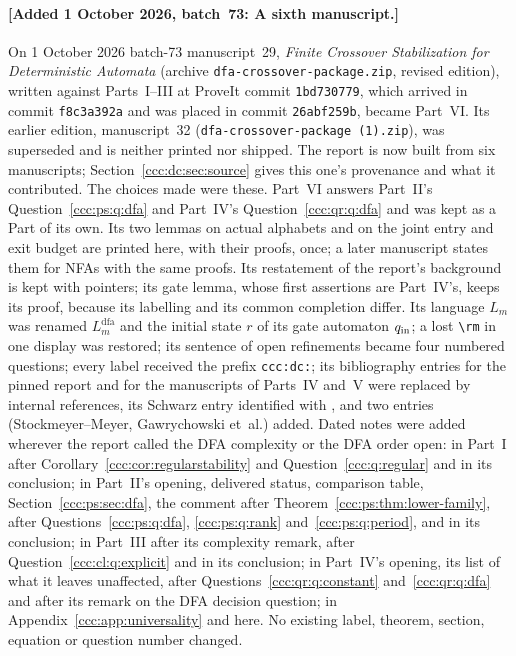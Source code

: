\documentclass[11pt,letterpaper]{article}
\theoremstyle{definition}
\theoremstyle{remark}
\newcommand{\waddsevthree}[1]{\textup{[}Added 1 October 2026, batch~73: #1\textup{]}}
\newcommand{\Ldfa}[1]{L^{\mathrm{dfa}}_{#1}}
\begin{document}
\paragraph{\waddsevthree{A sixth manuscript.}} On 1 October 2026 batch-73
manuscript~29, \emph{Finite Crossover Stabilization for Deterministic
Automata} (archive \texttt{dfa-crossover-package.zip}, revised edition),
written against Parts~I--III at ProveIt commit \texttt{1bd730779}, which
arrived in commit \texttt{f8c3a392a} and was placed in commit
\texttt{26abf259b}, became Part~VI. Its earlier edition, manuscript~32
(\texttt{dfa-crossover-package~(1).zip}), was superseded and is neither
printed nor shipped. The report is now built from six manuscripts;
Section~\ref{ccc:dc:sec:source} gives this one's provenance and what it
contributed. The choices made were these. Part~VI answers Part~II's
Question~\ref{ccc:ps:q:dfa} and Part~IV's Question~\ref{ccc:qr:q:dfa} and was
kept as a Part of its own. Its two lemmas on actual alphabets and on the
joint entry and exit budget are printed here, with their proofs, once; a
later manuscript states them for NFAs with the same proofs. Its restatement
of the report's background is kept with pointers; its gate lemma, whose first
assertions are Part~IV's, keeps its proof, because its labelling and its
common completion differ. Its language $L_m$ was renamed $\Ldfa m$ and the
initial state $r$ of its gate automaton $q_{\rm in}$; a lost \verb|\rm| in
one display was restored; its sentence of open refinements became four
numbered questions; every label received the prefix \texttt{ccc:dc:}; its
bibliography entries for the pinned report and for the manuscripts of
Parts~IV and~V were replaced by internal references, its Schwarz entry
identified with \cite{Schwarz}, and two entries (Stockmeyer--Meyer,
Gawrychowski et~al.) added. Dated notes were added wherever the report
called the DFA complexity or the DFA order open: in Part~I after
Corollary~\ref{ccc:cor:regularstability} and Question~\ref{ccc:q:regular}
and in its conclusion; in Part~II's opening, delivered status, comparison
table, Section~\ref{ccc:ps:sec:dfa}, the comment after
Theorem~\ref{ccc:ps:thm:lower-family}, after
Questions~\ref{ccc:ps:q:dfa}, \ref{ccc:ps:q:rank} and~\ref{ccc:ps:q:period},
and in its conclusion; in Part~III after its complexity remark, after
Question~\ref{ccc:cl:q:explicit} and in its conclusion; in Part~IV's
opening, its list of what it leaves unaffected, after
Questions~\ref{ccc:qr:q:constant} and~\ref{ccc:qr:q:dfa} and after its
remark on the DFA decision question; in Appendix~\ref{ccc:app:universality}
and here. No existing label, theorem, section, equation or question number
changed.
\end{document}
